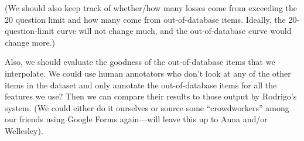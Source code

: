 \documentclass[a4paper,12pt]{article}
\begin{document}
(We should also keep track of whether/how many losses come from exceeding the 20 question limit and how many come from out-of-database items. Ideally, the 20-question-limit curve will not change much, and the out-of-database curve would change more.)

Also, we should evaluate the goodness of the out-of-database items that we interpolate.
We could use human annotators who don't look at any of the other items in the dataset and only annotate the out-of-database items for all the features we use? 
Then we can compare their results to those output by Rodrigo's system. 
(We could either do it ourselves or source some ``crowdworkers'' among our friends using Google Forms again---will leave this up to Anna and/or Wellesley).

\singlespacing
\printbibliography
\end{document}
